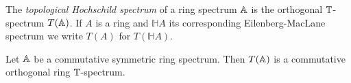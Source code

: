 \begin{mydef}
The \textit{topological Hochschild spectrum} of a ring spectrum $\mathbb{A}$ is the
orthogonal $\mathbb{T}$-spectrum $T(\mathbb{A})$. If $A$ is a ring and $\mathbb{H}A$ its
corresponding Eilenberg-MacLane spectrum we write $T(A)$ for $T(\mathbb{H}A)$.
\end{mydef}


\begin{prop}\label{prop:thhringspectrum}
Let $\mathbb{A}$ be a commutative symmetric ring spectrum. Then $T(\mathbb{A})$ is a commutative orthogonal ring $\mathbb{T}$-spectrum.
\end{prop}

